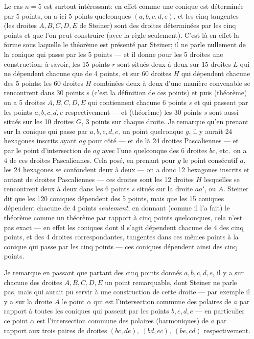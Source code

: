 \documentclass[11pt]{article}
\begin{document}
Le cas $n = 5$ est surtout int\'eressant: en effet comme une conique est d\'etermin\'ee par 5 points, on a ici 5 points quelconques $(a, b, c, d, e)$, et les cinq tangentes (les droites $A, B, C, D, E$ de Steiner) sont des droites d\'etermin\'ees par les cinq points et que l'on peut construire (avec la r\`egle seulement). C'est l\`a en effet la forme sous laquelle le th\'eor\`eme est pr\'esent\'e par Steiner; il ne parle nullement de la conique qui passe par les 5 points --- et il donne pour les 5 droites une construction; \`a savoir, les 15 points $r$ sont situ\'es deux \`a deux sur 15 droites $L$ qui ne d\'ependent chacune que de 4 points, et sur 60 droites $H$ qui d\'ependent chacune des 5 points; les 60 droites $H$ combin\'ees deux \`a deux d'une mani\`ere convenable se rencontrent dans 30 points $s$ (c'est la d\'efinition de ces points) et puis (th\'eor\`eme) on a 5 droites $A, B, C, D, E$ qui contiennent chacune 6 points $s$ et qui passent par les points $a, b, c, d, e$ respectivement --- et (th\'eor\`eme) les 30 points $s$ sont aussi situ\'es sur les 10 droites $G$, 3 points sur chaque droite. Je remarque qu'en prenant sur la conique qui passe par $a, b, c, d, e$, un point quelconque $g$, il y aurait 24 hexagones inscrits ayant $ag$ pour c\^ot\'e --- et de l\`a 24 droites Pascaliennes --- et par le point d'intersection de $ag$ avec l'une quelconque des 6 droites $bc$, etc.\ on a 4 de ces droites Pascaliennes. Cela pos\'e, en prenant pour $g$ le point cons\'ecutif $a$, les 24 hexagones se confondent deux \`a deux --- on a donc 12 hexagones inscrits et autant de droites Pascaliennes --- ces droites sont les 12 droites $H$ lesquelles se rencontrent deux \`a deux dans les 6 points $s$ situ\'es sur la droite $aa'$, ou $A$. Steiner dit que les 120 coniques d\'ependent des 5 points, mais que les 15 coniques d\'ependent chacune de 4 points \textit{seulement}; en donnant (comme il l'a fait) le th\'eor\`eme comme un th\'eor\`eme par rapport \`a cinq points quelconques, cela n'est pas exact --- en effet les coniques dont il s'agit d\'ependent chacune de 4 des cinq points, et des 4 droites correspondantes, tangentes dans ces m\^emes points \`a la conique qui passe par les cinq points --- ces coniques d\'ependent ainsi des cinq points.

Je remarque en passant que partant des cinq points donn\'es $a, b, c, d, e$, il y a sur chacune des droites $A, B, C, D, E$ un point remarquable, dont Steiner ne parle pas, mais qui aurait pu servir \`a une construction de cette droite --- par exemple il y a sur la droite $A$ le point $\alpha$ qui est l'intersection commune des polaires de $a$ par rapport \`a toutes les coniques qui passent par les points $b, c, d, e$ --- en particulier ce point $\alpha$ est l'intersection commune des polaires (harmoniques) de $a$ par rapport aux trois paires de droites $(bc, de),\ (bd, ec),\ (be, cd)$ respectivement.
\end{document}
